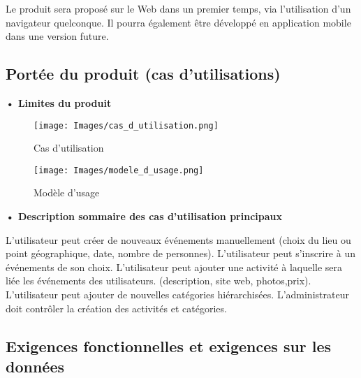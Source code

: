 \documentclass[a4paper,12pt]{article}
\begin{document}
Le produit sera proposé sur le Web dans un premier temps, via l’utilisation d’un navigateur quelconque. Il pourra également être développé en application mobile dans une version future.

\subsection{Portée du produit (cas d’utilisations)}
\label{Portée du produit}

\textbf{• Limites du produit}

\begin{figure}[H]
	\centerline{\texttt{[image: Images/cas\_d\_utilisation.png]}}
	\caption{Cas d'utilisation}
\end{figure}

\begin{figure}[H]
	\centerline{\texttt{[image: Images/modele\_d\_usage.png]}}
	\caption{Modèle d'usage}
\end{figure}


\textbf{• Description sommaire des cas d’utilisation principaux}

L’utilisateur peut créer de nouveaux événements manuellement (choix du lieu ou point géographique, date, nombre de personnes).
L’utilisateur peut s’inscrire à un événements de son choix.
L’utilisateur peut ajouter une activité à laquelle sera liée les événements des utilisateurs. (description, site web, photos,prix).
L'utilisateur peut ajouter de nouvelles catégories hiérarchisées.
L'administrateur doit contrôler la création des activités et catégories.

\subsection{Exigences fonctionnelles et exigences sur les données}
\end{document}
